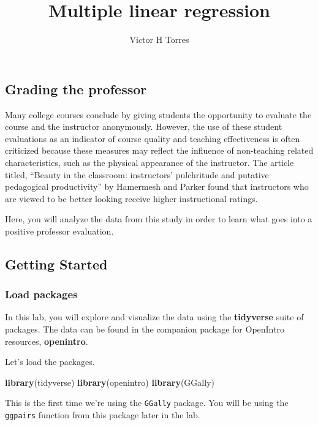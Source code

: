 \documentclass[
]{article}
\title{Multiple linear regression}
\author{Victor H Torres}
\date{}
\newenvironment{Shaded}{\begin{snugshade}}{\end{snugshade}}
\newcommand{\FunctionTok}[1]{\textcolor[rgb]{0.13,0.29,0.53}{\textbf{#1}}}
\newcommand{\NormalTok}[1]{#1}
\begin{document}
\maketitle

\subsection{Grading the professor}\label{grading-the-professor}

Many college courses conclude by giving students the opportunity to
evaluate the course and the instructor anonymously. However, the use of
these student evaluations as an indicator of course quality and teaching
effectiveness is often criticized because these measures may reflect the
influence of non-teaching related characteristics, such as the physical
appearance of the instructor. The article titled, ``Beauty in the
classroom: instructors' pulchritude and putative pedagogical
productivity'' by Hamermesh and Parker found that instructors who are
viewed to be better looking receive higher instructional ratings.

Here, you will analyze the data from this study in order to learn what
goes into a positive professor evaluation.

\subsection{Getting Started}\label{getting-started}

\subsubsection{Load packages}\label{load-packages}

In this lab, you will explore and visualize the data using the
\textbf{tidyverse} suite of packages. The data can be found in the
companion package for OpenIntro resources, \textbf{openintro}.

Let's load the packages.

\begin{Shaded}
\begin{Highlighting}[]
\FunctionTok{library}\NormalTok{(tidyverse)}
\FunctionTok{library}\NormalTok{(openintro)}
\FunctionTok{library}\NormalTok{(GGally)}
\end{Highlighting}
\end{Shaded}

This is the first time we're using the \texttt{GGally} package. You will
be using the \texttt{ggpairs} function from this package later in the
lab.
\end{document}
